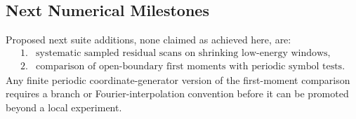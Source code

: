 \subsection{Next Numerical Milestones}

Proposed next suite additions, none claimed as achieved here, are:
\[
\begin{array}{ll}
1.&\text{systematic sampled residual scans on shrinking low-energy windows},\\
2.&\text{comparison of open-boundary first moments with periodic symbol tests}.
\end{array}
\]
Any finite periodic coordinate-generator version of the first-moment comparison
requires a branch or Fourier-interpolation convention before it can be promoted
beyond a local experiment.
